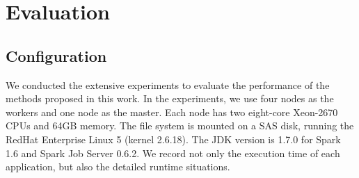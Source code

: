 \section{Evaluation}

\subsection{Configuration}

We conducted the extensive experiments to evaluate the performance of the methods proposed in this work. In the experiments, we use four nodes as the workers and one node as the master. Each node has two eight-core Xeon-2670 CPUs and 64GB memory. The file system is mounted on a SAS disk, running the RedHat Enterprise Linux 5 (kernel 2.6.18). The JDK version is 1.7.0 for Spark 1.6 and Spark Job Server 0.6.2. We record not only the execution time of each application, but also the detailed runtime situations.

\begin{comment}
\begin{table}[!t]
\small
\centering
\caption{Function APIs in each Application}
\vspace{-2mm}
\begin{tabular}{ c | c | c | c }

\hline
\textbf{App} & \textbf{Stages} & \textbf{Function API(s)} & \textbf{Cache} \\
\hline
Grep & 1 & \textit{filter} & No \\
\hline
WC & 2 & \textit{flatMap} \& \textit{reduceByKey} & No \\
\hline
Sort & 3 & \textit{distinct} \& \textit{sortByKey} & No \\
\hline
PR & N & \textit{groupByKey} \& \textit{map} \& \textit{reduceByKey} & Yes \\
\hline

\hline
\end{tabular}
\vspace{-4mm}
\label{table:app}
\end{table} 
\end{comment}

